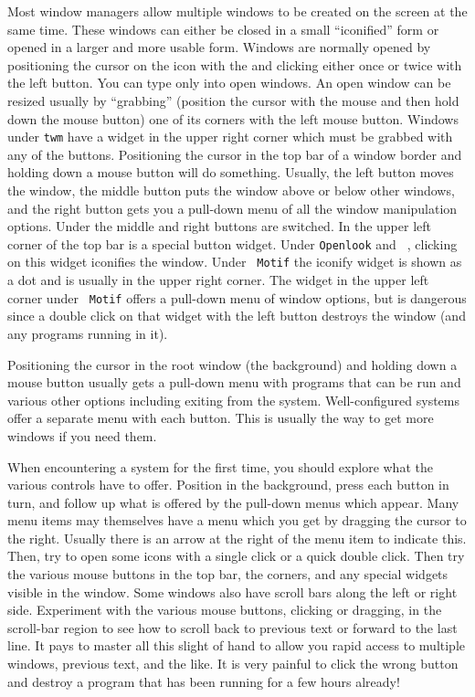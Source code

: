      Most window managers allow multiple windows to be created on the
screen at the same time.  These windows can either be closed in a small
``iconified'' form or opened in a larger and more usable form.
Windows are normally opened by positioning the cursor on the icon with
the  and clicking either once or twice with the left
button.  You can type only into open windows.  An open window can be
resized usually by ``grabbing'' (position the cursor with the mouse
and then hold down the mouse button) one of its corners with the left
mouse button.  Windows under {\tt twm} have a widget in the upper
right corner which must be grabbed with any of the buttons.
Positioning the cursor in the top bar of a window border and holding
down a mouse button will do something.  Usually, the left button moves
the window, the middle button puts the window above or below other
windows, and the right button gets you a pull-down menu of all the
window manipulation options.  Under {\tt {}} the middle and
right buttons are switched.  In the upper left corner of the top bar
is a special button widget.  Under {\tt Openlook} and {\tt
{}}, clicking on this widget iconifies the window.  Under {\tt
Motif} the iconify widget is shown as a dot and is usually in the
upper right corner.  The widget in the upper left corner under {\tt
Motif} offers a pull-down menu of window options, but is dangerous
since a double click on that widget with the left button destroys the
window (and any programs running in it).

     Positioning the cursor in the root window (the background) and
holding down a mouse button usually gets a pull-down menu with
programs that can be run and various other options including exiting
from the system.  Well-configured systems offer a separate menu with
each button.  This is usually the way to get more windows if you need
them.

     When encountering a system for the first time, you should explore
what the various controls have to offer.  Position in the background,
press each button in turn, and follow up what is offered by the
pull-down menus which appear.  Many menu items may themselves have a
menu which you get by dragging the cursor to the right.  Usually there
is an arrow at the right of the menu item to indicate this.  Then, try
to open some icons with a single click or a quick double click.  Then
try the various mouse buttons in the top bar, the corners, and any
special widgets visible in the window.  Some windows also have scroll
bars along the left or right side.  Experiment with the various mouse
buttons, clicking or dragging, in the scroll-bar region to see how to
scroll back to previous text or forward to the last line.  It pays to
master all this slight of hand to allow you rapid access to multiple
windows, previous text, and the like.  It is very painful to click the
wrong button and destroy a program that has been running for a few
hours already!


